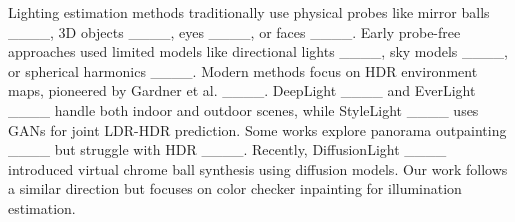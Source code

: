 \vspace{3pt}  
Lighting estimation methods traditionally use physical probes like mirror balls ____, 3D objects ____, eyes ____, or faces ____. Early probe-free approaches used limited models like directional lights ____, sky models ____, or spherical harmonics ____.
Modern methods focus on HDR environment maps, pioneered by Gardner et al. ____. DeepLight ____ and EverLight ____ handle both indoor and outdoor scenes, while StyleLight ____ uses GANs for joint LDR-HDR prediction. Some works explore panorama outpainting ____ but struggle with HDR ____.
Recently, DiffusionLight ____ introduced virtual chrome ball synthesis using diffusion models. Our work follows a similar direction but focuses on color checker inpainting for illumination estimation.

